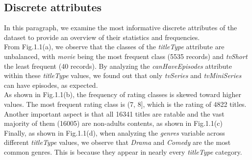 \subsection{Discrete attributes}
In this paragraph, we examine the most informative discrete attributes of the dataset to provide an overview of their statistics and frequencies. 
\\From Fig.1.1(a), we observe that the classes of the \textit{titleType} attribute are unbalanced, with \textit{movie} being the most frequent class (5535 records) and \textit{tvShort} the least frequent (40 records). By analyzing the \textit{canHaveEpisodes} attribute within these \textit{titleType} values, we found out that only \textit{tvSeries} and \textit{tvMiniSeries} can have episodes, as expected.
\\As shown in Fig.1.1(b), the frequency of rating classes is skewed toward higher values. The most frequent rating class is (7, 8], which is the rating of 4822 titles.
\\Another important aspect is that all 16341 titles are ratable and the vast majority of them (16005) are non-adults contents, as shown in Fig.1.1(c)
\\Finally, as shown in Fig.1.1(d), when analyzing the \textit{genres} variable across different \textit{titleType} values, we observe that \textit{Drama} and \textit{Comedy} are the most common genres. This is because they appear in nearly every \textit{titleType} category.

